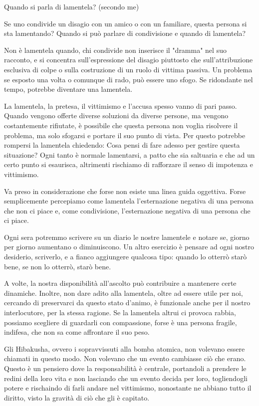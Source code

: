 \documentclass[12pt]{book} %
\begin{document}
\begin{mdframed}[linewidth=1pt]
Quando si parla di lamentela? (secondo me)

Se uno condivide un disagio con un amico o con un familiare, questa persona si sta lamentando? Quando si può parlare di condivisione e quando di lamentela?

Non è lamentela quando, chi condivide non inserisce il "dramma" nel suo racconto, e si concentra sull'espressione del disagio piuttosto che sull'attribuzione esclusiva di colpe o sulla costruzione di un ruolo di vittima passiva. 
Un problema se esposto una volta o comunque di rado, può essere uno sfogo. Se ridondante nel tempo, potrebbe diventare una lamentela.

La lamentela, la pretesa, il vittimismo e l'accusa spesso vanno di pari passo. Quando vengono offerte diverse soluzioni da diverse persone, ma vengono costantemente rifiutate, è possibile che questa persona non voglia risolvere il problema, ma solo sfogarsi e portare il suo punto di vista. 
Per questo potrebbe rompersi la lamentela chiedendo: Cosa pensi di fare adesso per gestire questa situazione?
Ogni tanto è normale lamentarsi, a patto che sia saltuaria e che ad un certo punto si esaurisca, altrimenti rischiamo di rafforzare il senso di impotenza e vittimismo.

Va preso in considerazione che forse non esiste una linea guida oggettiva. Forse
semplicemente percepiamo come lamentela l'esternazione negativa di una persona che non ci piace e, come condivisione,
l'esternazione negativa di una persona che ci piace.

Ogni sera potremmo scrivere su un diario le nostre lamentele e notare se, giorno per giorno
aumentano o diminuiscono.
Un altro esercizio è pensare ad ogni nostro desiderio, scriverlo, e a fianco aggiungere qualcosa tipo: quando lo otterrò starò bene, se non lo otterrò, starò bene.

A volte, la nostra disponibilità all’ascolto può contribuire a mantenere certe dinamiche. Inoltre, non dare adito alla lamentela, oltre ad essere utile per noi, cercando di preservarci da questo stato d'animo, è funzionale anche per il nostro interlocutore, per la stessa ragione.
Se la lamentela altrui ci provoca rabbia, possiamo scegliere di guardarli con compassione, forse è una persona fragile, indifesa, che non sa come affrontare il suo peso.

Gli Hibakusha, ovvero i sopravvissuti alla bomba atomica, non volevano essere chiamati in questo modo. Non volevano che
un evento cambiasse ciò che erano. Questo è un pensiero dove la responsabilità è centrale, portandoli a prendere le
redini della loro vita e non lasciando che un evento decida per loro, togliendogli potere e rischaindo di farli andare nel vittimismo, nonostante ne abbiano tutto il diritto, visto la gravità di ciò che gli è capitato. 
\end{mdframed}
\end{document}
